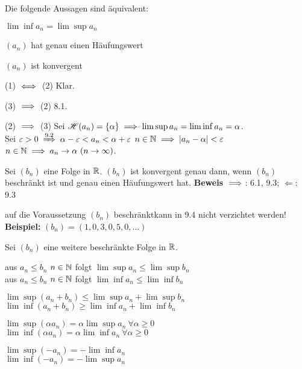 \documentclass[a4paper,twoside,DIV15,BCOR12mm]{scrbook}
\begin{document}
\begin{satz}
Die folgende  Aussagen sind äquivalent:
\begin{liste}
\item $\lim\inf a_n = \lim\sup a_n$
\item $(a_n)$ hat genau einen Häufungswert
\item $(a_n)$ ist konvergent
\end{liste}
\end{satz}

\begin{beweise}
\item{(1) $\iff$ (2)} Klar.
\item{(3) $\implies$ (2)} 8.1.
\item{(2) $\implies$ (3)} Sei $\mathscr{H}(a_n) = \{\alpha\} \implies \lim\sup a_n = \lim\inf a_n = \alpha$.\\
Sei $\ep>0 \folgtnach{9.2} \alpha - \ep < a_n < \alpha + \ep$ \ffa $n\in\mathbb{N} \implies |a_n- \alpha| < \varepsilon$ \ffa $n\in\MdN \folgt a_n\to\alpha \ (n\to\infty)$.
\end{beweise}

\begin{folgerung}
Sei $(b_n)$ eine Folge in $\mathbb{R}$. $(b_n)$ ist konvergent genau dann, wenn $(b_n)$ beschränkt ist und genau einen Häufungswert hat.
\textbf{Beweis}
\glqq$\implies$\grqq: 6.1, 9.3; \glqq$\Leftarrow$\grqq: 9.3
\end{folgerung}

\begin{beispiel}
auf die Voraussetzung \glqq$(b_n)$ beschränkt\grqq kann in 9.4 nicht verzichtet werden!\\
\textbf{Beispiel:} $(b_n)=(1,0,3,0,5,0,\ldots)$
\end{beispiel}

\begin{satz}
Sei $(b_n)$ eine weitere beschränkte Folge  in $\mathbb{R}$.
\begin{liste}
\item aus $a_n \le b_n$ \ffa $ n\in\mathbb{N}$ folgt $\lim\sup a_n \le \lim\sup b_n$ \\
aus $a_n \le b_n$ \ffa $ n\in\mathbb{N}$ folgt $\lim\inf a_n \le \lim\inf b_n$
\item $\lim\sup(a_n + b_n) \le \lim\sup a_n + \lim\sup b_n$ \\
$\lim\inf(a_n + b_n) \ge \lim\inf a_n + \lim\inf b_n$
\item $\lim\sup(\alpha a_n) = \alpha\lim\sup a_n \ \forall \alpha \ge 0$\\
$\lim\inf(\alpha a_n) = \alpha\lim\inf a_n \ \forall \alpha \ge 0$
\item $\lim\sup(- a_n) = -\lim\inf a_n$\\
$\lim\inf(- a_n) = -\lim\sup a_n$

\end{liste}
\end{satz}
\end{document}
